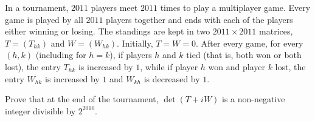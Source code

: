 In a tournament, $2011$ players meet $2011$ times to play a multiplayer game. Every game is played by all $2011$ players together and ends with each of the players either winning or losing. The standings are kept in two $2011\times2011$ matrices, $T=(T_{hk})$ and $W=(W_{hk})$. Initially, $T=W=0$. After every game, for every $(h,k)$ (including for $h=k$), if players $h$ and $k$ tied (that is, both won or both lost), the entry $T_{hk}$ is increased by $1$, while if player $h$ won and player $k$ lost, the entry $W_{hk}$ is increased by $1$ and $W_{kh}$ is decreased by $1$.

Prove that at the end of the tournament, $\det(T+iW)$ is a non-negative integer divisible by $2^{2010}$.